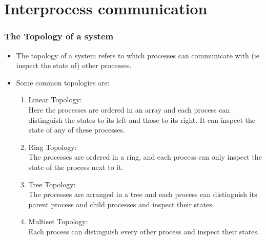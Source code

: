 \documentclass{beamer}
\begin{document}
    \section{Interprocess communication}
    {
        \begin{frame}
            \frametitle{The Topology of a system}
            \begin{itemize}
                \item The topology of a system refers to which processes can communicate with (ie inspect the state of) other processes.
                
                \item Some common topologies are:
                \begin{enumerate}
                    \item Linear Topology:\\Here the processes are ordered in an array and each process can distinguish the states to its left and those to its right. It can inspect the state of any of these processes.
                    \item Ring Topology:\\The processes are ordered in a ring, and each process can only inspect the state of the process next to it.
                    \item Tree Topology:\\The processes are arranged in a tree and each process can distinguish its parent process and child processes and inspect their states.
                    \item Multiset Topology:\\Each process can distinguish every other process and inspect their states.
                \end{enumerate}
            \end{itemize}
        \end{frame}

}
\end{document}
